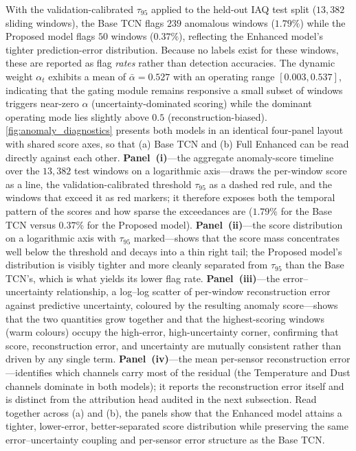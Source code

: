 With the validation-calibrated $\tau_{95}$ applied to the held-out IAQ test split ($13{,}382$ sliding windows), the Base TCN flags $239$ anomalous windows ($1.79\%$) while the Proposed model flags $50$ windows ($0.37\%$), reflecting the Enhanced model's tighter prediction-error distribution. Because no labels exist for these windows, these are reported as flag \emph{rates} rather than detection accuracies. The dynamic weight $\alpha_t$ exhibits a mean of $\bar{\alpha} = 0.527$ with an operating range $[0.003, 0.537]$, indicating that the gating module remains responsive a small subset of windows triggers near-zero $\alpha$ (uncertainty-dominated scoring) while the dominant operating mode lies slightly above $0.5$ (reconstruction-biased). \cref{fig:anomaly_diagnostics} presents both models in an identical four-panel layout with shared score axes, so that (a) Base TCN and (b) Full Enhanced can be read directly against each other. \textbf{Panel~(i)}---the aggregate anomaly-score timeline over the $13{,}382$ test windows on a logarithmic axis---draws the per-window score as a line, the validation-calibrated threshold $\tau_{95}$ as a dashed red rule, and the windows that exceed it as red markers; it therefore exposes both the temporal pattern of the scores and how sparse the exceedances are ($1.79\%$ for the Base TCN versus $0.37\%$ for the Proposed model). \textbf{Panel~(ii)}---the score distribution on a logarithmic axis with $\tau_{95}$ marked---shows that the score mass concentrates well below the threshold and decays into a thin right tail; the Proposed model's distribution is visibly tighter and more cleanly separated from $\tau_{95}$ than the Base TCN's, which is what yields its lower flag rate. \textbf{Panel~(iii)}---the error--uncertainty relationship, a log--log scatter of per-window reconstruction error against predictive uncertainty, coloured by the resulting anomaly score---shows that the two quantities grow together and that the highest-scoring windows (warm colours) occupy the high-error, high-uncertainty corner, confirming that score, reconstruction error, and uncertainty are mutually consistent rather than driven by any single term. \textbf{Panel~(iv)}---the mean per-sensor reconstruction error---identifies which channels carry most of the residual (the Temperature and Dust channels dominate in both models); it reports the reconstruction error itself and is distinct from the attribution head audited in the next subsection. Read together across (a) and (b), the panels show that the Enhanced model attains a tighter, lower-error, better-separated score distribution while preserving the same error--uncertainty coupling and per-sensor error structure as the Base TCN.


